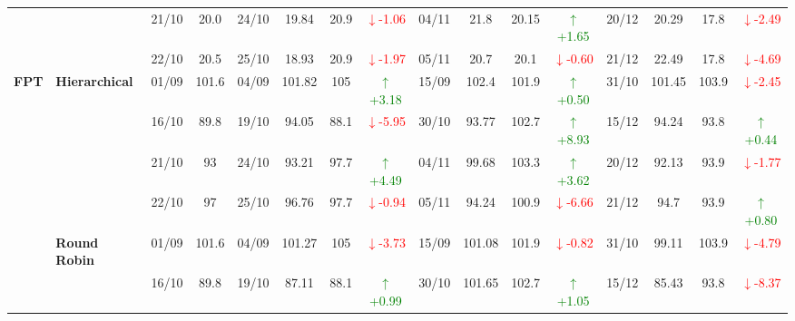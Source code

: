 \documentclass{ieeeaccess}
\begin{document}
{\begin{longtable}{llcc|cccc|cccc|cccc}
&
& 21/10 & 20.0 & 24/10 & 19.84 & 20.9 & \textcolor{red}{\(\downarrow\)-1.06} & 04/11 & 21.8 & 20.15 & \textcolor{green}{\(\uparrow\)+1.65} & 20/12 & 20.29 & 17.8 & \textcolor{red}{\(\downarrow\)-2.49} \\

&
& 22/10 & 20.5 & 25/10 & 18.93 & 20.9 & \textcolor{red}{\(\downarrow\)-1.97} & 05/11 & 20.7 & 20.1 & \textcolor{red}{\(\downarrow\)-0.60} & 21/12 & 22.49 & 17.8 & \textcolor{red}{\(\downarrow\)-4.69} \\
\midrule



\multirow{12}{*}{\textbf{FPT}} 
& \textbf{Hierarchical}
& 01/09 & 101.6 & 04/09 & 101.82 & 105 & \textcolor{green}{\(\uparrow\)+3.18} & 15/09 & 102.4 & 101.9 & \textcolor{green}{\(\uparrow\)+0.50} & 31/10 & 101.45 & 103.9 & \textcolor{red}{\(\downarrow\)-2.45} \\

&
& 16/10 & 89.8 & 19/10 & 94.05 & 88.1 & \textcolor{red}{\(\downarrow\)-5.95} & 30/10 & 93.77 & 102.7 & \textcolor{green}{\(\uparrow\)+8.93} & 15/12 & 94.24 & 93.8 & \textcolor{green}{\(\uparrow\)+0.44} \\

&
& 21/10 & 93 & 24/10 & 93.21 & 97.7 & \textcolor{green}{\(\uparrow\)+4.49} & 04/11 & 99.68 & 103.3 & \textcolor{green}{\(\uparrow\)+3.62} & 20/12 & 92.13 & 93.9 & \textcolor{red}{\(\downarrow\)-1.77} \\

&
& 22/10 & 97 & 25/10 & 96.76 & 97.7 & \textcolor{red}{\(\downarrow\)-0.94} & 05/11 & 94.24 & 100.9 & \textcolor{red}{\(\downarrow\)-6.66} & 21/12 & 94.7 & 93.9 & \textcolor{green}{\(\uparrow\)+0.80} \\
\cmidrule(lr){2-16}


& \textbf{Round Robin}
& 01/09 & 101.6 & 04/09 & 101.27 & 105 & \textcolor{red}{\(\downarrow\)-3.73} & 15/09 & 101.08 & 101.9 & \textcolor{red}{\(\downarrow\)-0.82} & 31/10 & 99.11 & 103.9 & \textcolor{red}{\(\downarrow\)-4.79} \\

&
& 16/10 & 89.8 & 19/10 & 87.11 & 88.1 & \textcolor{green}{\(\uparrow\)+0.99} & 30/10 & 101.65 & 102.7 & \textcolor{green}{\(\uparrow\)+1.05} & 15/12 & 85.43 & 93.8 & \textcolor{red}{\(\downarrow\)-8.37} \\


\end{longtable}}
\end{document}
